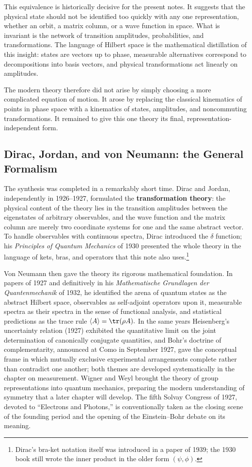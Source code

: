 This equivalence is historically decisive for the present notes. It suggests that the physical state should not be identified too quickly with any one representation, whether an orbit, a matrix column, or a wave function in space. What is invariant is the network of transition amplitudes, probabilities, and transformations. The language of Hilbert space is the mathematical distillation of this insight: states are vectors up to phase, measurable alternatives correspond to decompositions into basis vectors, and physical transformations act linearly on amplitudes.

The modern theory therefore did not arise by simply choosing a more complicated equation of motion. It arose by replacing the classical kinematics of points in phase space with a kinematics of states, amplitudes, and noncommuting transformations. It remained to give this one theory its final, representation-independent form.

\subsection{Dirac, Jordan, and von Neumann: the General Formalism}
\label{subsec:djv-formalism}
The synthesis was completed in a remarkably short time. Dirac and Jordan, independently in 1926--1927, formulated the \textbf{transformation theory}: the physical content of the theory lies in the transition amplitudes between the eigenstates of arbitrary observables, and the wave function and the matrix column are merely two coordinate systems for one and the same abstract vector. To handle observables with continuous spectra, Dirac introduced the $\delta$ function; his \emph{Principles of Quantum Mechanics} of 1930 presented the whole theory in the language of kets, bras, and operators that this note also uses.\footnote{Dirac's bra-ket notation itself was introduced in a paper of 1939; the 1930 book still wrote the inner product in the older form $(\psi,\phi)$.}

Von Neumann then gave the theory its rigorous mathematical foundation. In papers of 1927 and definitively in his \emph{Mathematische Grundlagen der Quantenmechanik} of 1932, he identified the arena of quantum states as the abstract Hilbert space, observables as self-adjoint operators upon it, measurable spectra as their spectra in the sense of functional analysis, and statistical predictions as the trace rule $\langle A\rangle=\tr(\rho A).$ In the same years Heisenberg's uncertainty relation (1927) exhibited the quantitative limit on the joint determination of canonically conjugate quantities, and Bohr's doctrine of complementarity, announced at Como in September 1927, gave the conceptual frame in which mutually exclusive experimental arrangements complete rather than contradict one another; both themes are developed systematically in the chapter on measurement. Wigner and Weyl brought the theory of group representations into quantum mechanics, preparing the modern understanding of symmetry that a later chapter will develop. The fifth Solvay Congress of 1927, devoted to ``Electrons and Photons,'' is conventionally taken as the closing scene of the founding period and the opening of the Einstein--Bohr debate on its meaning.

